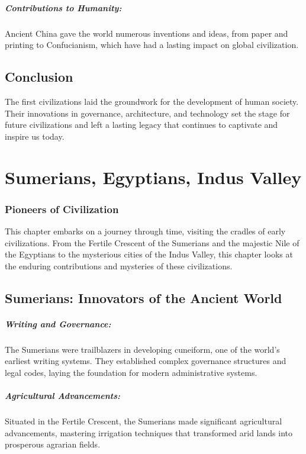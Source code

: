 \documentclass{book}
\begin{document}
\paragraph{Contributions to Humanity:}
Ancient China gave the world numerous inventions and ideas, from paper and printing to Confucianism, which have had a lasting impact on global civilization.

\section*{Conclusion}

The first civilizations laid the groundwork for the development of human society. Their innovations in governance, architecture, and technology set the stage for future civilizations and left a lasting legacy that continues to captivate and inspire us today.

\chapter{Sumerians, Egyptians, Indus Valley}
\subsection*{Pioneers of Civilization}
This chapter embarks on a journey through time, visiting the cradles of early civilizations. From the Fertile Crescent of the Sumerians and the majestic Nile of the Egyptians to the mysterious cities of the Indus Valley, this chapter looks at the enduring contributions and mysteries of these civilizations.

\section*{Sumerians: Innovators of the Ancient World}

\paragraph{Writing and Governance:}
The Sumerians were trailblazers in developing cuneiform, one of the world's earliest writing systems. They established complex governance structures and legal codes, laying the foundation for modern administrative systems.

\paragraph{Agricultural Advancements:}
Situated in the Fertile Crescent, the Sumerians made significant agricultural advancements, mastering irrigation techniques that transformed arid lands into prosperous agrarian fields.
\end{document}
